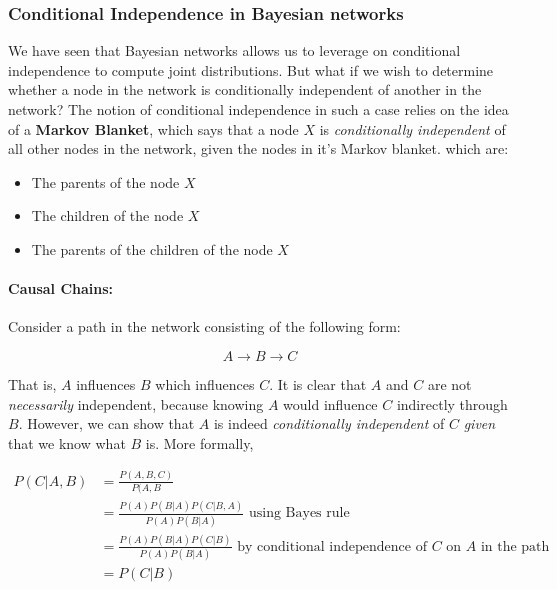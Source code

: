 \documentclass[12pt]{article}
\begin{document}
\subsubsection{Conditional Independence in Bayesian networks}

We have seen that Bayesian networks allows us to leverage on conditional independence to compute joint distributions. But what if we wish to determine whether a node in the network is conditionally independent of another in the network? The notion of conditional independence in such a case relies on the idea of a \textbf{Markov Blanket}, which says that a node $X$ is \textit{conditionally independent} of all other nodes in the network, given the nodes in it's Markov blanket. which are:

\begin{itemize}
\item The parents of the node $X$
\item The children of the node $X$
\item The parents of the children of the node $X$
\end{itemize}

\paragraph{Causal Chains:} Consider a path in the network consisting of the following form:

\begin{equation*}
A \rightarrow B \rightarrow C
\end{equation*}

That is, $A$ influences $B$ which influences $C$. It is clear that $A$ and $C$ are not \textit{necessarily} independent, because knowing $A$ would influence $C$ indirectly through $B$. However, we can show that $A$ is indeed \textit{conditionally independent} of $C$ \textit{given} that we know what $B$ is. More formally,

\begin{equation*}
\begin{aligned}
P(C| A, B) &= \frac{P(A,B,C)}{P(A,B}\\
&= \frac{P(A)P(B|A)P(C|B, A)}{P(A)P(B|A)} \text{ using Bayes rule}\\
&= \frac{P(A)P(B|A)P(C|B)}{P(A)P(B|A)} \text{ by conditional independence of $C$ on $A$ in the path}\\
& = P(C|B)
\end{aligned}
\end{equation*}
\end{document}
